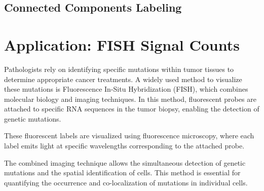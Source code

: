 \documentclass[a4paper,12pt]{article}
\begin{document}
\subsection{Connected Components Labeling}


\section{Application: FISH Signal Counts}


Pathologists rely on identifying specific mutations within tumor tissues to determine appropriate cancer treatments. A widely used method to visualize these mutations is Fluorescence In-Situ Hybridization (FISH), which combines molecular biology and imaging techniques. In this method, fluorescent probes are attached to specific RNA sequences in the tumor biopsy, enabling the detection of genetic mutations.

These fluorescent labels are visualized using fluorescence microscopy, where each label emits light at specific wavelengths corresponding to the attached probe.

The combined imaging technique allows the simultaneous detection of genetic mutations and the spatial identification of cells. This method is essential for quantifying the occurrence and co-localization of mutations in individual cells.
\end{document}
